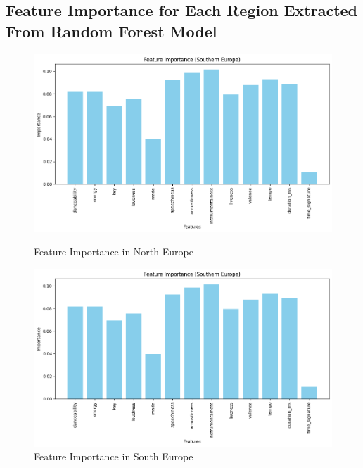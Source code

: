 \subsection{Feature Importance for Each Region Extracted From Random Forest Model}
\begin{figure}[h]
    \centering
    \begin{minipage}{0.45\textwidth}
        \centering
        \includegraphics[width=\linewidth]{media/rf_feature_imp_northen_europe.png}
        \caption{Feature Importance in North Europe}
    \end{minipage}%
    \hspace{0.05\textwidth} %
    \begin{minipage}{0.45\textwidth}
        \centering
        \includegraphics[width=\linewidth]{media/rf_feature_imp_southern_europe.png}
        \caption{Feature Importance in South Europe}
    \end{minipage}
\end{figure}
